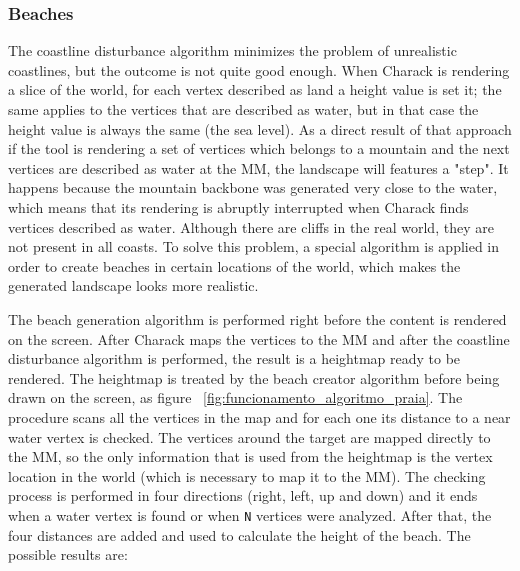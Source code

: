 \documentclass[10pt, conference, compsocconf]{IEEEtran}
\begin{document}
\subsubsection{Beaches}

The coastline disturbance algorithm minimizes the problem of unrealistic coastlines, but the outcome is not quite good enough. When Charack is rendering a slice of the world, for each vertex described as land a height value is set it; the same applies to the vertices that are described as water, but in that case the height value is always the same (the sea level). As a direct result of that approach if the tool is rendering a set of vertices which belongs to a mountain and the next vertices are described as water at the MM, the landscape will features a "step". It happens because the mountain backbone was generated very close to the water, which means that its rendering is abruptly interrupted when Charack finds vertices described as water. Although there are cliffs in the real world, they are not present in all coasts. To solve this problem, a special algorithm is applied in order to create beaches in certain locations of the world, which makes the generated landscape looks more realistic.

The beach generation algorithm is performed right before the content is rendered on the screen. After Charack maps the vertices to the MM and after the coastline disturbance algorithm is performed, the result is a heightmap ready to be rendered. The heightmap is treated by the beach creator algorithm before being drawn on the screen, as figure ~\ref{fig:funcionamento_algoritmo_praia}. The procedure scans all the vertices in the map and for each one its distance to a near water vertex is checked. The vertices around the target are mapped directly to the MM, so the only information that is used from the heightmap is the vertex location in the world (which is necessary to map it to the MM). The checking process is performed in four directions (right, left, up and down) and it ends when a water vertex is found or when {\tt N} vertices were analyzed. After that, the four distances are added and used to calculate the height of the beach. The possible results are:
\end{document}
